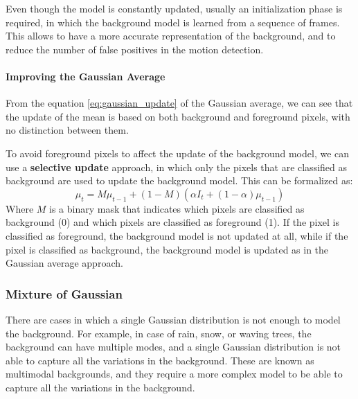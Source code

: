 Even though the model is constantly updated, usually an initialization phase is required, in which the background model is learned from a sequence of frames. This allows to have a more accurate
representation of the background, and to reduce the number of false positives in the motion detection.

\paragraph{Improving the Gaussian Average}
From the equation \ref{eq:gaussian_update} of the Gaussian average, we can see that the update of the mean is based on both
background and foreground pixels, with no distinction between them.

To avoid foreground pixels to affect the update of the background model, we can use a \textbf{selective update} approach,
in which only the pixels that are classified as background are used to update the background model. This can be formalized as:
\begin{equation}
    \mu_t = M\mu_{t-1} + (1 - M)(\alpha I_t + (1 - \alpha) \mu_{t-1})
\end{equation}
Where $M$ is a binary mask that indicates which pixels are classified as background (0) and which pixels are classified as foreground (1).
If the pixel is classified as foreground, the background model is not updated at all, while if the pixel is classified as background, 
the background model is updated as in the Gaussian average approach.

\subsubsection{Mixture of Gaussian}
There are cases in which a single Gaussian distribution is not enough to model the background. For example,
in case of rain, snow, or waving trees, the background can have multiple modes, and a single Gaussian distribution is not able to capture all the variations in the background.
These are known as multimodal backgrounds, and they require a more complex model to be able to capture all the variations in the background.

